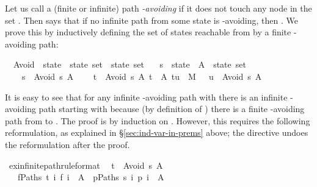 \begin{isabellebody}
\begin{isamarkuptext}
Let us call a (finite or infinite) path \emph{-avoiding} if it does
not touch any node in the set . Then  says
that if no infinite path from some state  is -avoiding,
then . We prove this by inductively defining the set
 of states reachable from  by a finite -avoiding path:
\end{isamarkuptext}%
\isamarkuptrue%
\isamarkupfalse%
\isanewline
\ \ Avoid\ {\isacharcolon}{\isacharcolon}\ {\isachardoublequoteopen}state\ {\isasymRightarrow}\ state\ set\ {\isasymRightarrow}\ state\ set{\isachardoublequoteclose}\isanewline
\ \ \ s\ {\isacharcolon}{\isacharcolon}\ state\ \ A\ {\isacharcolon}{\isacharcolon}\ {\isachardoublequoteopen}state\ set{\isachardoublequoteclose}\isanewline
{}\isanewline
\ \ \ \ {\isachardoublequoteopen}s\ {\isasymin}\ Avoid\ s\ A{\isachardoublequoteclose}\isanewline
\ \ {\isacharbar}\ {\isachardoublequoteopen}{\isasymlbrakk}\ t\ {\isasymin}\ Avoid\ s\ A{\isacharsemicolon}\ t\ {\isasymnotin}\ A{\isacharsemicolon}\ {\isacharparenleft}t{\isacharcomma}u{\isacharparenright}\ {\isasymin}\ M\ {\isasymrbrakk}\ {\isasymLongrightarrow}\ u\ {\isasymin}\ Avoid\ s\ A{\isachardoublequoteclose}%
\begin{isamarkuptext}%
It is easy to see that for any infinite -avoiding path 
with  there is an infinite -avoiding path
starting with  because (by definition of ) there is a
finite -avoiding path from  to .
The proof is by induction on . However,
this requires the following
reformulation, as explained in \S\ref{sec:ind-var-in-prems} above;
the  directive undoes the reformulation after the proof.%
\end{isamarkuptext}%
\isamarkuptrue%
\isamarkupfalse%
\ ex{\isacharunderscore}infinite{\isacharunderscore}path{\isacharbrackleft}rule{\isacharunderscore}format{\isacharbrackright}{\isacharcolon}\isanewline
\ \ {\isachardoublequoteopen}t\ {\isasymin}\ Avoid\ s\ A\ \ {\isasymLongrightarrow}\isanewline
\ \ \ {\isasymforall}f{\isasymin}Paths\ t{\isachardot}\ {\isacharparenleft}{\isasymforall}i{\isachardot}\ f\ i\ {\isasymnotin}\ A{\isacharparenright}\ {\isasymlongrightarrow}\ {\isacharparenleft}{\isasymexists}p{\isasymin}Paths\ s{\isachardot}\ {\isasymforall}i{\isachardot}\ p\ i\ {\isasymnotin}\ A{\isacharparenright}{\isachardoublequoteclose}\isanewline

\end{isabellebody}
